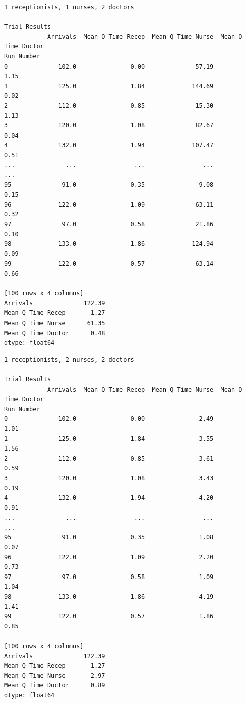 \documentclass[
  letterpaper,
  DIV=11,
  numbers=noendperiod]{scrreprt}
\begin{document}
\begin{verbatim}
1 receptionists, 1 nurses, 2 doctors

Trial Results
            Arrivals  Mean Q Time Recep  Mean Q Time Nurse  Mean Q Time Doctor
Run Number                                                                    
0              102.0               0.00              57.19                1.15
1              125.0               1.84             144.69                0.02
2              112.0               0.85              15.30                1.13
3              120.0               1.08              82.67                0.04
4              132.0               1.94             107.47                0.51
...              ...                ...                ...                 ...
95              91.0               0.35               9.08                0.15
96             122.0               1.09              63.11                0.32
97              97.0               0.58              21.86                0.10
98             133.0               1.86             124.94                0.09
99             122.0               0.57              63.14                0.66

[100 rows x 4 columns]
Arrivals              122.39
Mean Q Time Recep       1.27
Mean Q Time Nurse      61.35
Mean Q Time Doctor      0.48
dtype: float64
\end{verbatim}

\begin{verbatim}
1 receptionists, 2 nurses, 2 doctors

Trial Results
            Arrivals  Mean Q Time Recep  Mean Q Time Nurse  Mean Q Time Doctor
Run Number                                                                    
0              102.0               0.00               2.49                1.01
1              125.0               1.84               3.55                1.56
2              112.0               0.85               3.61                0.59
3              120.0               1.08               3.43                0.19
4              132.0               1.94               4.20                0.91
...              ...                ...                ...                 ...
95              91.0               0.35               1.08                0.07
96             122.0               1.09               2.20                0.73
97              97.0               0.58               1.09                1.04
98             133.0               1.86               4.19                1.41
99             122.0               0.57               1.86                0.85

[100 rows x 4 columns]
Arrivals              122.39
Mean Q Time Recep       1.27
Mean Q Time Nurse       2.97
Mean Q Time Doctor      0.89
dtype: float64
\end{verbatim}
\end{document}
